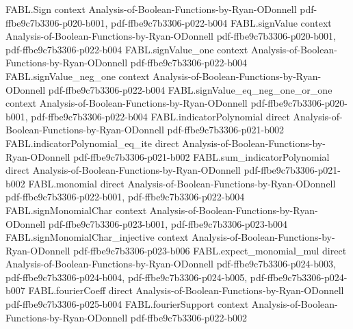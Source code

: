 \begin{theorem}
\label{FABL.two_div_pi_mul_arcsin_le_noiseStability_majority_odd}
\leanok
{}
\proofstep
  {FABL.Sign}
  {context}
  {Analysis-of-Boolean-Functions-by-Ryan-ODonnell}
  {pdf-ffbe9c7b3306-p020-b001,
    pdf-ffbe9c7b3306-p022-b004}
\proofstep
  {FABL.signValue}
  {context}
  {Analysis-of-Boolean-Functions-by-Ryan-ODonnell}
  {pdf-ffbe9c7b3306-p020-b001,
    pdf-ffbe9c7b3306-p022-b004}
\proofstep
  {FABL.signValue_one}
  {context}
  {Analysis-of-Boolean-Functions-by-Ryan-ODonnell}
  {pdf-ffbe9c7b3306-p022-b004}
\proofstep
  {FABL.signValue_neg_one}
  {context}
  {Analysis-of-Boolean-Functions-by-Ryan-ODonnell}
  {pdf-ffbe9c7b3306-p022-b004}
\proofstep
  {FABL.signValue_eq_neg_one_or_one}
  {context}
  {Analysis-of-Boolean-Functions-by-Ryan-ODonnell}
  {pdf-ffbe9c7b3306-p020-b001,
    pdf-ffbe9c7b3306-p022-b004}
\proofstep
  {FABL.indicatorPolynomial}
  {direct}
  {Analysis-of-Boolean-Functions-by-Ryan-ODonnell}
  {pdf-ffbe9c7b3306-p021-b002}
\proofstep
  {FABL.indicatorPolynomial_eq_ite}
  {direct}
  {Analysis-of-Boolean-Functions-by-Ryan-ODonnell}
  {pdf-ffbe9c7b3306-p021-b002}
\proofstep
  {FABL.sum_indicatorPolynomial}
  {direct}
  {Analysis-of-Boolean-Functions-by-Ryan-ODonnell}
  {pdf-ffbe9c7b3306-p021-b002}
\proofstep
  {FABL.monomial}
  {direct}
  {Analysis-of-Boolean-Functions-by-Ryan-ODonnell}
  {pdf-ffbe9c7b3306-p022-b001,
    pdf-ffbe9c7b3306-p022-b004}
\proofstep
  {FABL.signMonomialChar}
  {context}
  {Analysis-of-Boolean-Functions-by-Ryan-ODonnell}
  {pdf-ffbe9c7b3306-p023-b001,
    pdf-ffbe9c7b3306-p023-b004}
\proofstep
  {FABL.signMonomialChar_injective}
  {context}
  {Analysis-of-Boolean-Functions-by-Ryan-ODonnell}
  {pdf-ffbe9c7b3306-p023-b006}
\proofstep
  {FABL.expect_monomial_mul}
  {direct}
  {Analysis-of-Boolean-Functions-by-Ryan-ODonnell}
  {pdf-ffbe9c7b3306-p024-b003,
    pdf-ffbe9c7b3306-p024-b004,
    pdf-ffbe9c7b3306-p024-b005,
    pdf-ffbe9c7b3306-p024-b007}
\proofstep
  {FABL.fourierCoeff}
  {direct}
  {Analysis-of-Boolean-Functions-by-Ryan-ODonnell}
  {pdf-ffbe9c7b3306-p025-b004}
\proofstep
  {FABL.fourierSupport}
  {context}
  {Analysis-of-Boolean-Functions-by-Ryan-ODonnell}
  {pdf-ffbe9c7b3306-p022-b002}

\end{theorem}
